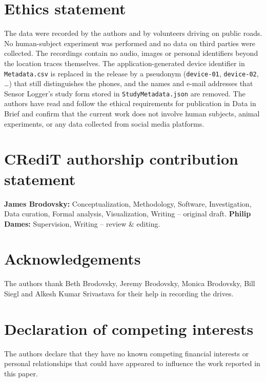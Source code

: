 \section*{Ethics statement}

The data were recorded by the authors and by volunteers driving on public roads. No human-subject experiment was performed and no data on third parties were collected. The recordings contain no audio, images or personal identifiers beyond the location traces themselves. The application-generated device identifier in \texttt{Metadata.csv} is replaced in the release by a pseudonym (\texttt{device-01}, \texttt{device-02}, \ldots) that still distinguishes the phones, and the names and e-mail addresses that Sensor Logger's study form stored in \texttt{StudyMetadata.json} are removed.  The authors have read and follow the ethical requirements for publication in Data in Brief and confirm that the current work does not involve human subjects, animal experiments, or any data collected from social media platforms.

\section*{CRediT authorship contribution statement}

\textbf{James Brodovsky:} Conceptualization, Methodology, Software, Investigation, Data curation, Formal analysis, Visualization, Writing -- original draft. \textbf{Philip Dames:} Supervision, Writing -- review \& editing. 

\section*{Acknowledgements}

The authors thank Beth Brodovsky, Jeremy Brodovsky, Monica Brodovsky, Bill Siegl and Alkesh Kumar Srivastava for their help in recording the drives. 

\section*{Declaration of competing interests}

The authors declare that they have no known competing financial interests or personal relationships that could have appeared to influence the work reported in this paper. 
